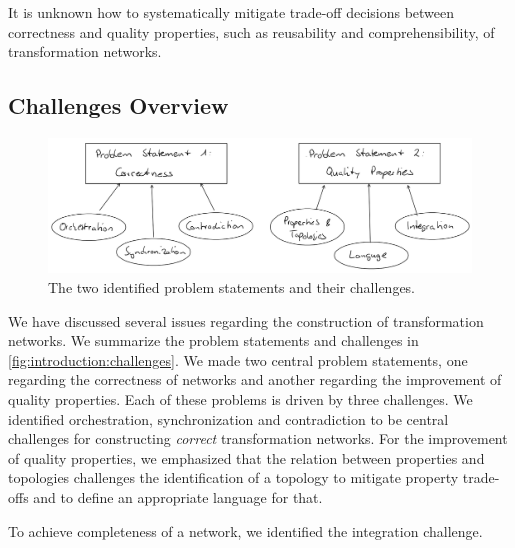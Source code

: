 \begin{problemstatement}
    It is unknown how to systematically mitigate trade-off decisions between correctness and quality properties, such as reusability and comprehensibility, of transformation networks.
\end{problemstatement}


\subsection{Challenges Overview}

\begin{figure}
    \centering
    \includegraphics[width=\textwidth]{figures/prologue/introduction/challenges.png}
    \caption[Problem statements and challenges]{The two identified problem statements and their challenges.}
    \label{fig:introduction:challenges}
\end{figure}

We have discussed several issues regarding the construction of transformation networks.
We summarize the problem statements and challenges in \autoref{fig:introduction:challenges}.
We made two central problem statements, one regarding the correctness of networks and another regarding the improvement of quality properties.
Each of these problems is driven by three challenges.
We identified orchestration, synchronization and contradiction to be central challenges for constructing \emph{correct} transformation networks.
For the improvement of quality properties, we emphasized that the relation between properties and topologies challenges the identification of a topology to mitigate property trade-offs and to define an appropriate language for that.
\begin{integrationcontribution}
To achieve completeness of a network, we identified the integration challenge. %
\end{integrationcontribution}


